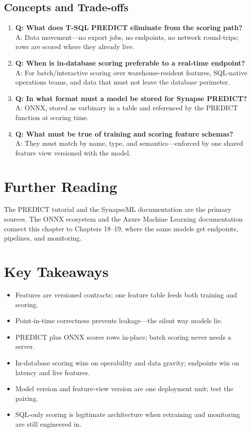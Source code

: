 \subsection{Concepts and Trade-offs}
\begin{enumerate}
    \item \textbf{Q: What does T-SQL PREDICT eliminate from the scoring path?}\\
    A: Data movement---no export jobs, no endpoints, no network round-trips; rows are scored where they already live.
    \item \textbf{Q: When is in-database scoring preferable to a real-time endpoint?}\\
    A: For batch/interactive scoring over warehouse-resident features, SQL-native operations teams, and data that must not leave the database perimeter.
    \item \textbf{Q: In what format must a model be stored for Synapse PREDICT?}\\
    A: ONNX, stored as varbinary in a table and referenced by the PREDICT function at scoring time.
    \item \textbf{Q: What must be true of training and scoring feature schemas?}\\
    A: They must match by name, type, and semantics---enforced by one shared feature view versioned with the model.
\end{enumerate}

\section{Further Reading}
The PREDICT tutorial \cite{microsoft2025synapsePredict} and the SynapseML documentation \cite{microsoft2025synapseml} are the primary sources. The ONNX ecosystem and the Azure Machine Learning documentation \cite{microsoft2025azureml} connect this chapter to Chapters 18--19, where the same models get endpoints, pipelines, and monitoring.

\section*{Key Takeaways}
\begin{itemize}
    \item Features are versioned contracts; one feature table feeds both training and scoring.
    \item Point-in-time correctness prevents leakage---the silent way models lie.
    \item PREDICT plus ONNX scores rows in-place; batch scoring never needs a server.
    \item In-database scoring wins on operability and data gravity; endpoints win on latency and live features.
    \item Model version and feature-view version are one deployment unit; test the pairing.
    \item SQL-only scoring is legitimate architecture when retraining and monitoring are still engineered in.
\end{itemize}

